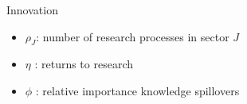 \documentclass[11pt,aspectratio=169]{beamer}
\begin{document}
\begin{frame}{Innovation}
\begin{minipage}[t!]{0.43\textwidth}
\end{minipage}
\vspace{-5mm}
\begin{minipage}[t!]{0.55\textwidth}
	\vspace{0mm}
	\begin{itemize}	
		\item[] $\rho_J$: number of research processes in sector $J$
		\vspace{-2mm}			
		\item[] $\eta$ : returns to research
		\vspace{-2mm}			
		\item[] $\phi$ : relative importance knowledge spillovers
	\end{itemize}
\end{minipage}
\end{frame}
\end{document}
